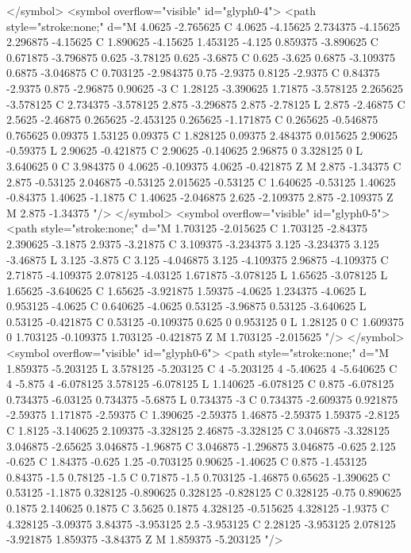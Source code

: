</symbol>
<symbol overflow="visible" id="glyph0-4">
<path style="stroke:none;" d="M 4.0625 -2.765625 C 4.0625 -4.15625 2.734375 -4.15625 2.296875 -4.15625 C 1.890625 -4.15625 1.453125 -4.125 0.859375 -3.890625 C 0.671875 -3.796875 0.625 -3.78125 0.625 -3.6875 C 0.625 -3.625 0.6875 -3.109375 0.6875 -3.046875 C 0.703125 -2.984375 0.75 -2.9375 0.8125 -2.9375 C 0.84375 -2.9375 0.875 -2.96875 0.90625 -3 C 1.28125 -3.390625 1.71875 -3.578125 2.265625 -3.578125 C 2.734375 -3.578125 2.875 -3.296875 2.875 -2.78125 L 2.875 -2.46875 C 2.5625 -2.46875 0.265625 -2.453125 0.265625 -1.171875 C 0.265625 -0.546875 0.765625 0.09375 1.53125 0.09375 C 1.828125 0.09375 2.484375 0.015625 2.90625 -0.59375 L 2.90625 -0.421875 C 2.90625 -0.140625 2.96875 0 3.328125 0 L 3.640625 0 C 3.984375 0 4.0625 -0.109375 4.0625 -0.421875 Z M 2.875 -1.34375 C 2.875 -0.53125 2.046875 -0.53125 2.015625 -0.53125 C 1.640625 -0.53125 1.40625 -0.84375 1.40625 -1.1875 C 1.40625 -2.046875 2.625 -2.109375 2.875 -2.109375 Z M 2.875 -1.34375 "/>
</symbol>
<symbol overflow="visible" id="glyph0-5">
<path style="stroke:none;" d="M 1.703125 -2.015625 C 1.703125 -2.84375 2.390625 -3.1875 2.9375 -3.21875 C 3.109375 -3.234375 3.125 -3.234375 3.125 -3.46875 L 3.125 -3.875 C 3.125 -4.046875 3.125 -4.109375 2.96875 -4.109375 C 2.71875 -4.109375 2.078125 -4.03125 1.671875 -3.078125 L 1.65625 -3.078125 L 1.65625 -3.640625 C 1.65625 -3.921875 1.59375 -4.0625 1.234375 -4.0625 L 0.953125 -4.0625 C 0.640625 -4.0625 0.53125 -3.96875 0.53125 -3.640625 L 0.53125 -0.421875 C 0.53125 -0.109375 0.625 0 0.953125 0 L 1.28125 0 C 1.609375 0 1.703125 -0.109375 1.703125 -0.421875 Z M 1.703125 -2.015625 "/>
</symbol>
<symbol overflow="visible" id="glyph0-6">
<path style="stroke:none;" d="M 1.859375 -5.203125 L 3.578125 -5.203125 C 4 -5.203125 4 -5.40625 4 -5.640625 C 4 -5.875 4 -6.078125 3.578125 -6.078125 L 1.140625 -6.078125 C 0.875 -6.078125 0.734375 -6.03125 0.734375 -5.6875 L 0.734375 -3 C 0.734375 -2.609375 0.921875 -2.59375 1.171875 -2.59375 C 1.390625 -2.59375 1.46875 -2.59375 1.59375 -2.8125 C 1.8125 -3.140625 2.109375 -3.328125 2.46875 -3.328125 C 3.046875 -3.328125 3.046875 -2.65625 3.046875 -1.96875 C 3.046875 -1.296875 3.046875 -0.625 2.125 -0.625 C 1.84375 -0.625 1.25 -0.703125 0.90625 -1.40625 C 0.875 -1.453125 0.84375 -1.5 0.78125 -1.5 C 0.71875 -1.5 0.703125 -1.46875 0.65625 -1.390625 C 0.53125 -1.1875 0.328125 -0.890625 0.328125 -0.828125 C 0.328125 -0.75 0.890625 0.1875 2.140625 0.1875 C 3.5625 0.1875 4.328125 -0.515625 4.328125 -1.9375 C 4.328125 -3.09375 3.84375 -3.953125 2.5 -3.953125 C 2.28125 -3.953125 2.078125 -3.921875 1.859375 -3.84375 Z M 1.859375 -5.203125 "/>
